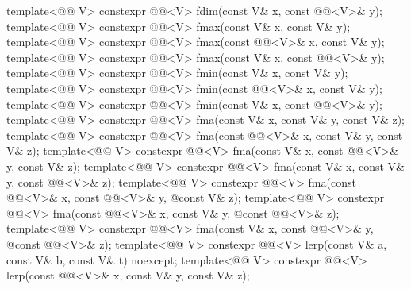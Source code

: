 \begin{codeblock}
{  template<@@ V>
    constexpr @@<V> fdim(const V& x, const @@<V>& y);
  template<@@ V>
    constexpr @@<V> fmax(const V& x, const V& y);
  template<@@ V>
    constexpr @@<V> fmax(const @@<V>& x, const V& y);
  template<@@ V>
    constexpr @@<V> fmax(const V& x, const @@<V>& y);
  template<@@ V>
    constexpr @@<V> fmin(const V& x, const V& y);
  template<@@ V>
    constexpr @@<V> fmin(const @@<V>& x, const V& y);
  template<@@ V>
    constexpr @@<V> fmin(const V& x, const @@<V>& y);
  template<@@ V>
    constexpr @@<V> fma(const V& x, const V& y, const V& z);
  template<@@ V>
    constexpr @@<V> fma(const @@<V>& x, const V& y, const V& z);
  template<@@ V>
    constexpr @@<V> fma(const V& x, const @@<V>& y, const V& z);
  template<@@ V>
    constexpr @@<V> fma(const V& x, const V& y, const @@<V>& z);
  template<@@ V>
    constexpr @@<V> fma(const @@<V>& x, const @@<V>& y,
                                  @\itcorr@ const V& z);
  template<@@ V>
    constexpr @@<V> fma(const @@<V>& x, const V& y,
                                  @\itcorr@ const @@<V>& z);
  template<@@ V>
    constexpr @@<V> fma(const V& x, const @@<V>& y,
                                  @\itcorr@ const @@<V>& z);
  template<@@ V>
    constexpr @@<V>
      lerp(const V& a, const V& b, const V& t) noexcept;
  template<@@ V>
    constexpr @@<V> lerp(const @@<V>& x, const V& y, const V& z);
}
\end{codeblock}
